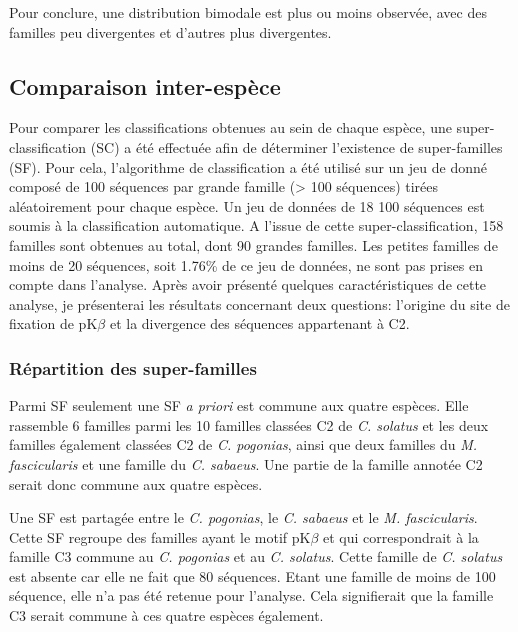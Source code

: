 \documentclass[12pt,a4paper]{article}
\begin{document}
	Pour conclure, une distribution bimodale est plus ou moins observée, avec des familles peu divergentes et d'autres plus divergentes.
	\subsection{Comparaison inter-espèce}
	Pour comparer les classifications obtenues au sein de chaque espèce, une super-classification (SC) a été effectuée afin de déterminer l'existence de super-familles (SF). Pour cela, l'algorithme de classification a été utilisé sur un jeu de donné composé de 100 séquences par grande famille (> 100 séquences) tirées aléatoirement pour chaque espèce. Un jeu de données de 18 100 séquences est soumis à la classification automatique. A l'issue de cette super-classification, 158 familles sont obtenues au total, dont 90 grandes familles. Les petites familles de moins de 20 séquences, soit 1.76\% de ce jeu de données, ne sont pas prises en compte dans l'analyse. Après avoir présenté quelques caractéristiques de cette analyse, je présenterai les résultats concernant deux questions: l'origine du site de fixation de pK$\beta$ et la divergence des séquences appartenant à C2.
	
	\subsubsection{Répartition des super-familles}
	Parmi SF seulement une SF \textit{a priori} est commune aux quatre espèces. Elle rassemble 6 familles parmi les 10 familles classées C2 de \textit{C. solatus} et les deux familles également classées C2 de \textit{C. pogonias}, ainsi que deux familles du \textit{M. fascicularis} et une famille du \textit{C. sabaeus}. Une partie de la famille annotée C2 serait donc commune aux quatre espèces.
	
	Une SF est partagée entre le \textit{C. pogonias}, le \textit{C. sabaeus} et le \textit{M. fascicularis}. Cette SF regroupe des familles ayant le motif pK$\beta$ et qui correspondrait à la famille C3 commune au \textit{C. pogonias} et au \textit{C. solatus}. Cette famille de \textit{C. solatus} est absente car elle ne fait que 80 séquences. Etant une famille de moins de 100 séquence, elle n'a pas été retenue pour l'analyse. Cela signifierait que la famille C3 serait commune à ces quatre espèces également.
	
\end{document}
